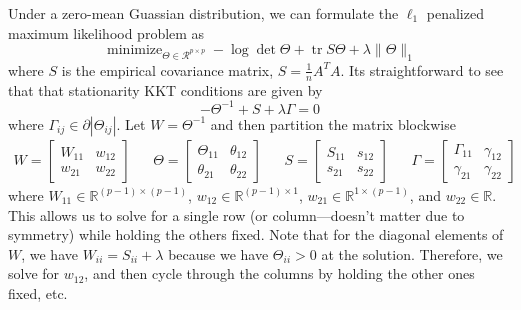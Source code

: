 \documentclass[twoside]{article}
\DeclareMathOperator*{\minimize}{minimize}
\DeclareMathOperator*{\tr}{tr}
\begin{document}
Under a zero-mean Guassian distribution, we can formulate the $\ell_1$ penalized maximum likelihood problem as 
\begin{equation*}
\minimize_{\Theta \in \mathcal{R}^{p \times p}} -\log \det \Theta + \tr S \Theta + \lambda \|\Theta \|_1
\end{equation*}
where $S$ is the empirical covariance matrix, $S = \frac{1}{n}A^TA$.  Its straightforward to see that that stationarity KKT conditions are given by 
\begin{equation*}
-\Theta^{-1} + S + \lambda\Gamma = 0
\end{equation*}
where $\Gamma_{ij} \in \partial|\Theta_{ij}|$. Let $W = \Theta^{-1}$ and then partition the matrix blockwise
\begin{align*}
W = \left[ \begin{array}{ll} W_{11} & w_{12} \\ w_{21} & w_{22} \end{array} \right] &&
\Theta = \left[ \begin{array}{ll} \Theta_{11} & \theta_{12} \\ \theta_{21} & \theta_{22} \end{array} \right] &&
S = \left[ \begin{array}{ll} S_{11} & s_{12} \\ s_{21} & s_{22} \end{array} \right] &&
\Gamma = \left[ \begin{array}{ll} \Gamma_{11} & \gamma_{12} \\ \gamma_{21} & \gamma_{22} \end{array} \right]
\end{align*}
where $W_{11} \in \mathbb{R}^{(p-1)\times(p-1)}$, $w_{12} \in \mathbb{R}^{(p-1)\times 1}$, $w_{21} \in \mathbb{R}^{1\times(p -1)}$, and $w_{22} \in \mathbb{R}$.  This allows us to solve for a single row (or column---doesn't matter due to symmetry) while holding the others fixed. Note that for the diagonal elements of $W$, we have $W_{ii} = S_{ii} + \lambda$ because we have $\Theta_{ii} > 0$ at the solution. Therefore, we solve for $w_{12}$, and then cycle through the columns by holding the other ones fixed, etc.
\end{document}
